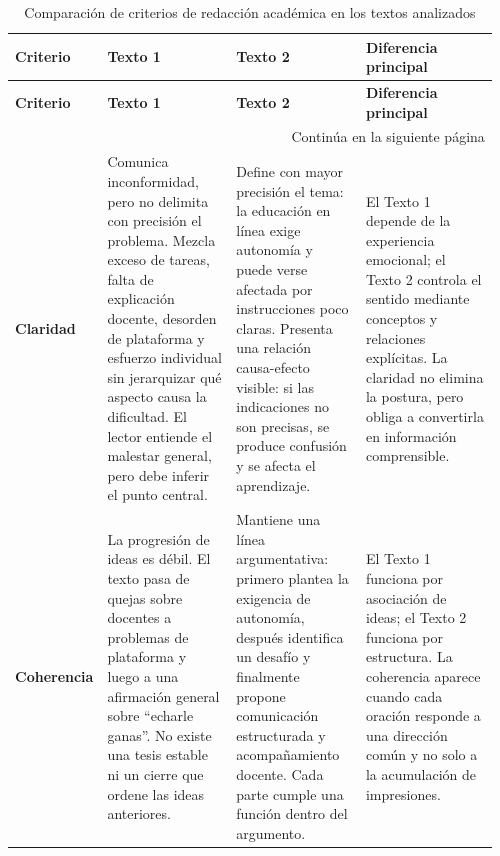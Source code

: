 \clearpage
\pagestyle{empty}
\begin{landscape}
\begingroup
\scriptsize
\setlength{\tabcolsep}{4pt}
\renewcommand{\arraystretch}{1.35}
\begin{longtable}{@{}p{0.14\linewidth}p{0.27\linewidth}p{0.27\linewidth}p{0.28\linewidth}@{}}
\caption{Comparación de criterios de redacción académica en los textos analizados}
\label{tab:comparacion-redaccion-academica}\\
\toprule
\textbf{Criterio} & \textbf{Texto 1} & \textbf{Texto 2} & \textbf{Diferencia principal} \\
\midrule
\endfirsthead
\toprule
\textbf{Criterio} & \textbf{Texto 1} & \textbf{Texto 2} & \textbf{Diferencia principal} \\
\midrule
\endhead
\midrule
\multicolumn{4}{r}{Continúa en la siguiente página} \\
\endfoot
\bottomrule
\endlastfoot

\textbf{Claridad} &
Comunica inconformidad, pero no delimita con precisión el problema. Mezcla exceso de tareas, falta de explicación docente, desorden de plataforma y esfuerzo individual sin jerarquizar qué aspecto causa la dificultad. El lector entiende el malestar general, pero debe inferir el punto central. &
Define con mayor precisión el tema: la educación en línea exige autonomía y puede verse afectada por instrucciones poco claras. Presenta una relación causa-efecto visible: si las indicaciones no son precisas, se produce confusión y se afecta el aprendizaje. &
El Texto 1 depende de la experiencia emocional; el Texto 2 controla el sentido mediante conceptos y relaciones explícitas. La claridad no elimina la postura, pero obliga a convertirla en información comprensible. \\
\midrule

\textbf{Coherencia} &
La progresión de ideas es débil. El texto pasa de quejas sobre docentes a problemas de plataforma y luego a una afirmación general sobre ``echarle ganas''. No existe una tesis estable ni un cierre que ordene las ideas anteriores. &
Mantiene una línea argumentativa: primero plantea la exigencia de autonomía, después identifica un desafío y finalmente propone comunicación estructurada y acompañamiento docente. Cada parte cumple una función dentro del argumento. &
El Texto 1 funciona por asociación de ideas; el Texto 2 funciona por estructura. La coherencia aparece cuando cada oración responde a una dirección común y no solo a la acumulación de impresiones. \\
\midrule


\end{longtable}
\end{landscape}
